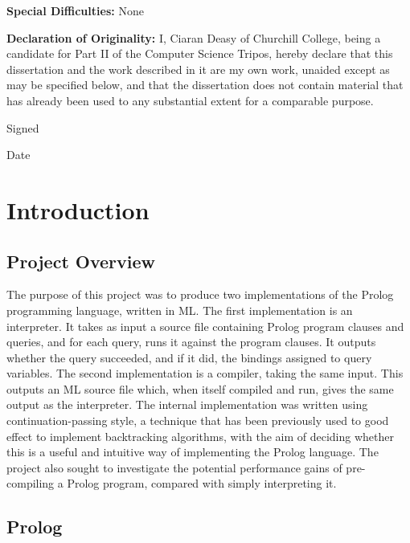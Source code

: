 \documentclass[12pt]{article}
\begin{document}
\vspace{0.25in}

{\bf Special Difficulties:} None

{\bf Declaration of Originality:}
I, Ciaran Deasy of Churchill College, being a candidate for Part II of the Computer Science Tripos, hereby declare that this dissertation and the work described in it are my own work, unaided except as may be specified below, and that the dissertation does not contain material that has already been used to any substantial extent for a comparable purpose. 

Signed %

Date %

\vfil
\eject

\tableofcontents 

\newpage

\section{Introduction}


\subsection{Project Overview}

The purpose of this project was to produce two implementations of the Prolog programming language, written in ML. 
The first implementation is an interpreter.
It takes as input a source file containing Prolog program clauses and queries, and for each query, runs it against the program clauses. 
It outputs whether the query succeeded, and if it did, the bindings assigned to query variables.
The second implementation is a compiler, taking the same input. 
This outputs an ML source file which, when itself compiled and run, gives the same output as the interpreter.
The internal implementation was written using continuation-passing style, a technique that has been previously used to good effect to implement backtracking algorithms, with the aim of deciding whether this is a useful and intuitive way of implementing the Prolog language. 
The project also sought to investigate the potential performance gains of pre-compiling a Prolog program, compared with simply interpreting it.

\subsection{Prolog}
\end{document}
